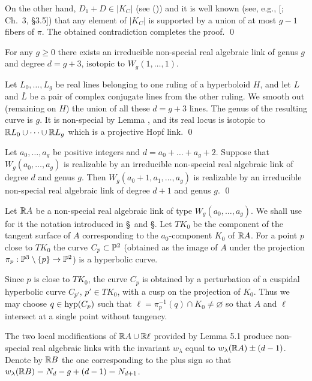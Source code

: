 On the other hand, $D_1+D\in |K_C|$ (see (\eqNonSpe)) and it is well known (see, e.g.,
[; Ch.~3, \S 3.5]) that
any element of $|K_C|$ is supported by a union of at most $g-1$ fibers of $\pi$. The obtained contradiction
completes the proof.
 \qed\enddemo


For any $g\ge 0$ there exists an irreducible non-special real algebraic link
of genus $g$ and degree $d=g+3$, isotopic to $W_g(1,\dots,1)$.
\endproclaim

 Let $L_0,\dots,L_g$ be real lines belonging to one ruling
of a hyperboloid $H$, and let $L$ and $\bar L$ be a pair of complex conjugate
lines from the other ruling.
We smooth out (remaining on $H$) the union of all these $d=g+3$ lines.
The genus of the resulting curve is $g$. It is non-special by Lemma \lemNonSpe, and
its real locus is isotopic to $\Bbb R L_0\cup\dots\cup\Bbb R L_g$ which is a projective Hopf link.
\qed\enddemo


Let $a_0,\dots,a_g$ be positive integers and $d=a_0+\dots+a_g+2$.
Suppose that $W_g(a_0,\dots,a_g)$ is realizable by an irreducible non-special
real algebraic link of degree $d$ and genus $g$.
Then $W_g(a_0+1,a_1,\dots,a_g)$
is realizable by an irreducible non-special real algebraic link of degree $d+1$ and genus $g$. \qed
\endproclaim

Let $\Bbb R A$ be a non-special real algebraic link of type $W_g(a_0,\dots,a_g)$.
We shall use for it the notation introduced in \S\sectHypSpa\ and \S\sectT.
Let $TK_0$ be the component of the tangent surface of $A$
corresponding to the $a_0$-component $K_0$ of $\Bbb R A$.
For a point $p$ close to $TK_0$ the curve $C_p\subset\pp^2$
(obtained as the image of $A$ under the projection $\pi_p:\pp^3\setminus\{p\}\to\pp^2$)
is a hyperbolic curve.

Since $p$ is close to $TK_0$, the curve $C_p$ is obtained by a perturbation
of a cuspidal hyperbolic curve $C_{p'}$, $p'\in TK_0$, with a cusp on
the projection of $K_0$. Thus we may choose $q\in\operatorname{hyp}(C_p)$ such that
$\ell=\pi^{-1}_p(q)\cap K_0\neq\varnothing$ so that $A$ and $\ell$ intersect
at a single point without tangency.

The two local modifications of $\Bbb R A\cup\Bbb R\ell$ provided by Lemma 5.1
produce non-special real algebraic links with the invariant $w_\lambda$
equal to $w_\lambda(\Bbb R A)\pm (d-1)$. Denote by $\Bbb R B$ the one corresponding
to the plus sign so that $w_\lambda(\Bbb R B)=N_d-g+(d-1)=N_{d+1}$.

